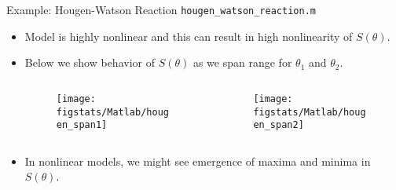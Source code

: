 \documentclass[handout,9pt]{beamer}
\begin{document}
%
\begin{frame}{Example: Hougen-Watson Reaction \footnotesize{\texttt{hougen\_watson\_reaction.m}}}

\begin{itemize}
\setlength{\itemsep}{10pt}
\item Model is highly nonlinear and this can result in high nonlinearity of $S(\theta)$.
\item Below we show behavior of $S(\theta)$ as we span range for $\theta_1$ and $\theta_2$.
\begin{columns}
\begin{column}{0.5\textwidth}
\begin{figure}[!htb]
    \centering
	\texttt{[image: figstats/Matlab/hougen\_span1]}
\end{figure}
\end{column}
\begin{column}{0.5\textwidth}
\begin{figure}[!htb]
    \centering
	\texttt{[image: figstats/Matlab/hougen\_span2]}
\end{figure}
\end{column}
\end{columns}
\item In nonlinear models, we might see emergence of maxima and minima in $S(\theta)$.

\end{itemize}


\end{frame}
\end{document}
